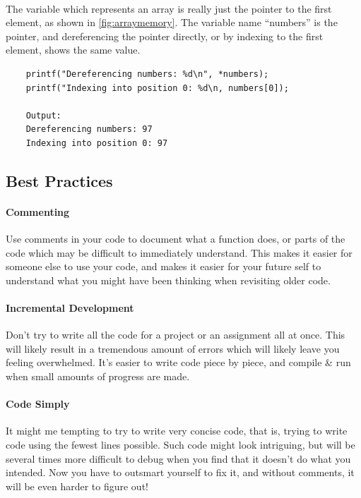 \documentclass[letter,11pt]{article}
\begin{document}
\paragraph{}The variable which represents an array is really just the pointer to the first element, as shown in \autoref{fig:arraymemory}. The variable name ``numbers'' is the pointer, and dereferencing the pointer directly, or by indexing to the first element, shows the same value.
\begin{verbatim}
    printf("Dereferencing numbers: %d\n", *numbers);
    printf("Indexing into position 0: %d\n, numbers[0]);
    
    Output:
    Dereferencing numbers: 97
    Indexing into position 0: 97
\end{verbatim}

\subsection{Best Practices}
\paragraph{Commenting}Use comments in your code to document what a function does, or parts of the code which may be difficult to immediately understand. This makes it easier for someone else to use your code, and makes it easier for your future self to understand what you might have been thinking when revisiting older code.

\paragraph{Incremental Development}Don't try to write all the code for a project or an assignment all at once. This will likely result in a tremendous amount of errors which will likely leave you feeling overwhelmed. It's easier to write code piece by piece, and compile \& run when small amounts of progress are made.

\paragraph{Code Simply}It might me tempting to try to write very concise code, that is, trying to write code using the fewest lines possible. Such code might look intriguing, but will be several times more difficult to debug when you find that it doesn't do what you intended. Now you have to outsmart yourself to fix it, and without comments, it will be even harder to figure out!
\end{document}
